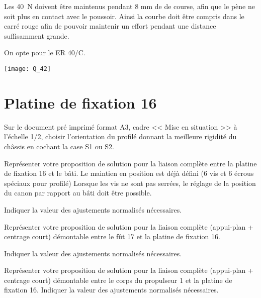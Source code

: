 \documentclass[11pt]{article}
\begin{document}
\begin{UPSTIcorrige}
Les \SI{40}{N} doivent être maintenus pendant 8 mm de de course, afin que le pène ne soit plus en contact avec le poussoir. Ainsi la courbe doit être compris dans le carré rouge afin de pouvoir maintenir un effort pendant une distance suffisamment grande. 

On opte pour le ER 40/C.

\begin{center}
\texttt{[image: Q\_42]}
\end{center}


\end{UPSTIcorrige}



\section{Platine de fixation 16}

\UPSTIquestion* Sur le document pré imprimé format A3, cadre << Mise en situation >> à l'échelle 1/2, choisir l'orientation du profilé donnant la meilleure rigidité du châssis en cochant la case S1 ou S2. 
\begin{UPSTIcorrige}
\end{UPSTIcorrige}

\UPSTIquestion Représenter votre proposition de solution pour la liaison complète entre la platine de fixation 16 et le bâti. Le maintien en position est déjà défini (6 vis et 6 écrous spéciaux pour profilé) Lorsque les vis ne sont pas serrées, le réglage de la position du canon par rapport au bâti doit être possible.
 
Indiquer la valeur des ajustements normalisés nécessaires.
\begin{UPSTIcorrige}
\end{UPSTIcorrige}

\UPSTIquestion Représenter votre proposition de solution pour la liaison complète (appui-plan + centrage court) démontable entre le fût 17 et la platine de fixation 16. 

Indiquer la valeur des ajustements normalisés nécessaires.
\begin{UPSTIcorrige}
\end{UPSTIcorrige}

\UPSTIquestion Représenter votre proposition de solution pour la liaison complète (appui-plan + centrage court) démontable entre le corps du propulseur 1 et la platine de fixation 16. Indiquer la valeur des ajustements normalisés nécessaires.
\end{document}

